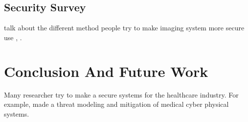 \documentclass[pdf,bookmarks,colorlinks=true]{IEEEtran}
\begin{document}
\subsection{Security Survey}
talk about the different method people try to make imaging system more secure
use \cite{Marwan}, \cite{stites2016secure}.

\section{Conclusion And Future Work}
\label{sec:Conclusion}

Many researcher try to make a secure systems for the healthcare industry. For example, \cite{Almohri:2017:TMM:3204094.3204113} made a threat modeling and mitigation of medical cyber physical systems. 





\end{document}
